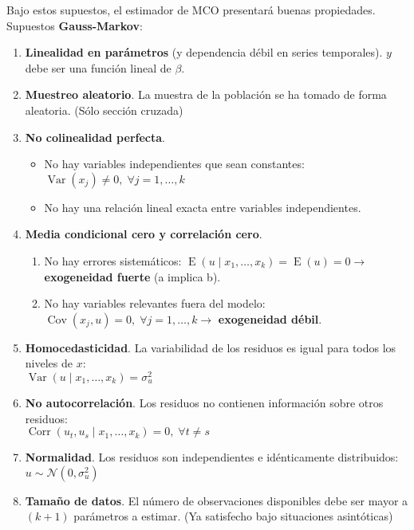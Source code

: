 \documentclass[10pt, a4paper, landscape]{article}
\DeclareMathOperator{\E}{E}
\DeclareMathOperator{\Var}{Var}
\DeclareMathOperator{\Cov}{Cov}
\DeclareMathOperator{\Corr}{Corr}
\begin{document}
\begin{multicols}{3}
Bajo estos supuestos, el estimador de MCO presentará buenas propiedades. Supuestos \textbf{Gauss-Markov}:

\begin{enumerate}[leftmargin=*]
	\item \textbf{Linealidad en parámetros} (y dependencia débil en series temporales). \( y \) debe ser una función lineal de \( \beta \).
	\item \textbf{Muestreo aleatorio}. La muestra de la población se ha tomado de forma aleatoria. (Sólo sección cruzada)
	\item \textbf{No colinealidad perfecta}.
	\begin{itemize}[leftmargin=*]
		\item No hay variables independientes que sean constantes: \( \Var(x_{j}) \neq 0, \; \forall j = 1, \ldots, k \)
		\item No hay una relación lineal exacta entre variables independientes.
	\end{itemize}
	\item \textbf{Media condicional cero y correlación cero}.
	\begin{enumerate}[leftmargin=*, label=\alph{*}.]
		\item No hay errores sistemáticos: \( \E(u \mid x_{1}, \ldots, x_{k}) = \E(u) = 0 \rightarrow \) \textbf{exogeneidad fuerte} (a implica b).
		\item No hay variables relevantes fuera del modelo: \( \Cov(x_{j}, u) = 0, \; \forall j = 1, \ldots, k \rightarrow \) \textbf{exogeneidad débil}.
	\end{enumerate}
	\item \textbf{Homocedasticidad}. La variabilidad de los residuos es igual para todos los niveles de \( x \): \\ \( \Var(u \mid x_{1}, \ldots, x_{k}) = \sigma_{u}^{2} \)
	\item \textbf{No autocorrelación}. Los residuos no contienen información sobre otros residuos: \\ \( \Corr(u_{t}, u_{s} \mid x_{1}, \ldots, x_{k}) = 0, \; \forall t \neq s \)
	\item \textbf{Normalidad}. Los residuos son independientes e idénticamente distribuidos: \( u \sim \mathcal{N} (0, \sigma_{u}^{2}) \)
	\item \textbf{Tamaño de datos}. El número de observaciones disponibles debe ser mayor a \( (k + 1) \) parámetros a estimar. (Ya satisfecho bajo situaciones asintóticas)
\end{enumerate}


\end{multicols}
\end{document}
